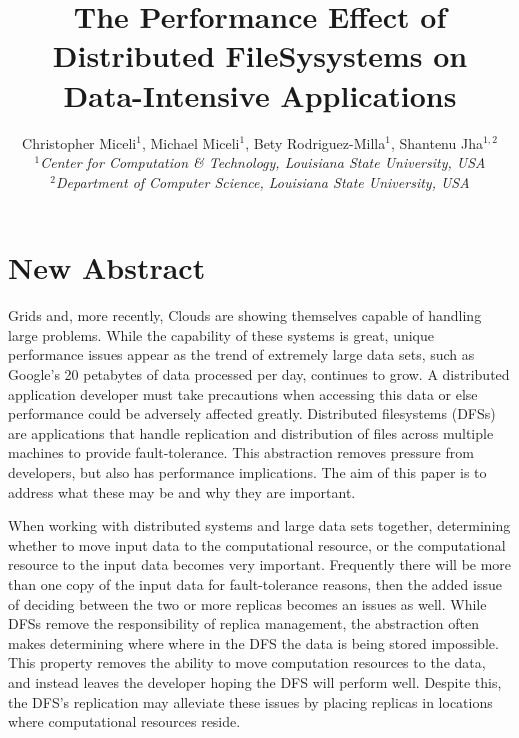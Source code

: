 \documentclass[a4paper,11pt]{article}
\begin{document}
\title{\large The Performance Effect of Distributed FileSysystems on Data-Intensive Applications}

\author{Christopher Miceli$^{1}$, Michael Miceli$^{1}$, Bety Rodriguez-Milla$^{1}$, Shantenu Jha$^{1,2}$\\
  \small{\emph{$^{1}$Center for Computation \& Technology, Louisiana State University, USA}}\\
  \small{\emph{$^{2}$Department of Computer Science, Louisiana State
      University, USA}}}

\maketitle

\section{New Abstract}

Grids and, more recently, Clouds are showing themselves capable of handling large problems. While the capability of these systems is great, unique performance issues appear as the trend of extremely large data sets, such as Google's 20 petabytes of data processed per day, continues to grow. A distributed application developer must take precautions when accessing this data or else performance could be adversely affected greatly. Distributed filesystems (DFSs) are applications that handle replication and distribution of files across multiple machines to provide fault-tolerance. This abstraction removes pressure from developers, but also has performance implications. The aim of this paper is to address what these may be and why they are important.

When working with distributed systems and large data sets together, determining whether to move input data to the computational resource, or the computational resource to the input data becomes very important. Frequently there will be more than one copy of the input data for fault-tolerance reasons, then the added issue of deciding between the two or more replicas becomes an issues as well. While DFSs remove the responsibility of replica management, the abstraction often makes determining where where in the DFS the data is being stored impossible. This property removes the ability to move computation resources to the data, and instead leaves the developer hoping the DFS will perform well. Despite this, the DFS's replication may alleviate these issues by placing replicas in locations where computational resources reside.
\end{document}
